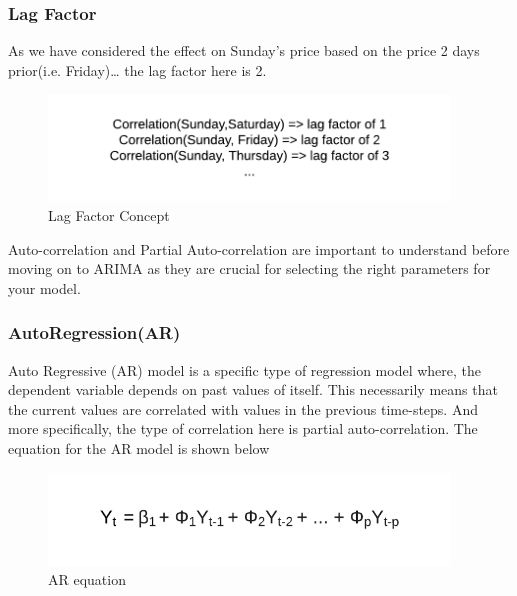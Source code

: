 \documentclass[12pt]{report}
\begin{document}
\subsubsection{Lag Factor}
As we have considered the effect on Sunday’s price based on the price 2 days prior(i.e. Friday)… the lag factor here is 2.

\begin{figure}[H]%
  \begin {center}
  \includegraphics[width=0.95\textwidth]{images/Lag_F.png}
  \caption{Lag Factor Concept}
  \label{fig:ecg}
  \end {center}
\end{figure}

Auto-correlation and Partial Auto-correlation are important to understand before moving on to ARIMA as they are crucial for selecting the right parameters for your model. 

\subsubsection{AutoRegression(AR)}
Auto Regressive (AR) model is a specific type of regression model where, the dependent variable depends on past values of itself.
This necessarily means that the current values are correlated with values in the previous time-steps. And more specifically, the type of correlation here is partial auto-correlation.
The equation for the AR model is shown below

\begin{figure}[H]%
  \begin {center}
  \includegraphics[width=0.95\textwidth]{images/AR_E.png}
  \caption{AR equation}
  \label{fig:ecg}
  \end {center}
\end{figure}
\end{document}

